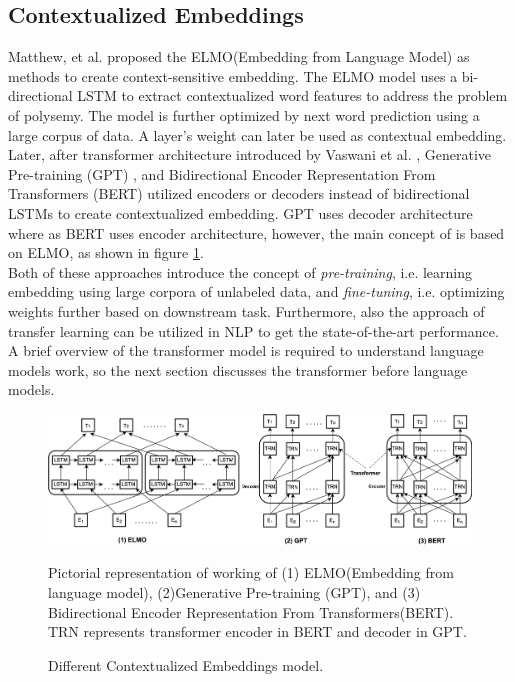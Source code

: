 \documentclass[%
	BCOR=8mm, %
	DIV=12,
	toc=bibliography, %
	toc=listof, %
	oneside, %
	egregdoesnotlikesansseriftitles, %
	]{scrbook}
\begin{document}
 \subsection{Contextualized Embeddings}
 \label{subsection:contextembeddings}
 Matthew, et al.\cite{peters_deep_2018-3} proposed the ELMO(Embedding from Language Model) as methods to create context-sensitive embedding. The ELMO model uses a bi-directional LSTM to extract contextualized word features to address the problem of polysemy. The model is further optimized by next word prediction using a large corpus of data. A layer's weight can later be used as contextual embedding. \\
 Later, after transformer architecture introduced by  Vaswani et al. \cite{vaswani_attention_2017}, Generative Pre-training (GPT) \cite{radford_improving_nodate}, and Bidirectional Encoder Representation From Transformers (BERT) \cite{devlin_bert_2019-1} utilized  encoders or decoders instead of bidirectional LSTMs to create contextualized embedding. GPT uses decoder architecture where as BERT uses encoder architecture, however, the main concept of is based on ELMO, as shown in figure \ref{fig:elmo}. \\
 Both of these approaches introduce the concept of \textit{pre-training}, i.e. learning embedding using large corpora of unlabeled data, and \textit{fine-tuning}, i.e. optimizing weights further based on downstream task. Furthermore, also the approach of transfer learning can be utilized in NLP to get the state-of-the-art performance. A brief overview of the transformer model is required to understand language models work, so the next section discusses the transformer before language models.

\begin{figure}[h!]
    \centering
    \includegraphics[width=1.0\linewidth]{img/elmo}
    \caption{Different Contextualized Embeddings model.}{Pictorial representation of working of (1) ELMO(Embedding from language model),  (2)Generative Pre-training (GPT), and (3) Bidirectional Encoder Representation From Transformers(BERT). TRN represents transformer encoder in BERT and decoder in GPT.}
    \label{fig:elmo}
\end{figure}
\end{document}
